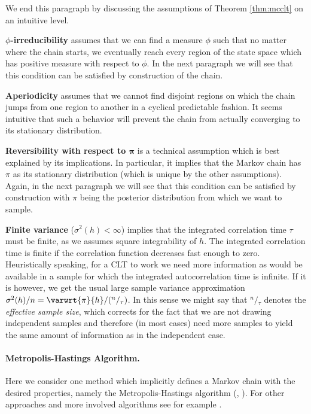 \noindent
We end this paragraph by discussing the assumptions of Theorem \ref{thm:mcclt} on an intuitive level.

\textbf{$\phi$-irreducibility} assumes that we can find a measure $\phi$ such that no matter where the chain starts, we eventually reach every region of the state space which has positive measure with respect to $\phi$.
In the next paragraph we will see that this condition can be satisfied by construction of the chain.

\textbf{Aperiodicity} assumes that we cannot find disjoint regions on which the chain jumps from one region to another in a cyclical predictable fashion.
It seems intuitive that such a behavior will prevent the chain from actually converging to its stationary distribution.

\textbf{Reversibility with respect to $\bm{\pi}$} is a technical assumption which is best explained by its implications.
In particular, it implies that the Markov chain has $\pi$ as its stationary distribution (which is unique by the other assumptions).
Again, in the next paragraph we will see that this condition can be satisfied by construction with $\pi$ being the posterior distribution from which we want to sample.

\textbf{Finite variance} ($\sigma^2(h) < \infty$) implies that the integrated correlation time $\tau$ must be finite, as we assumes square integrability of $h$.
The integrated correlation time is finite if the correlation function decreases fast enough to zero.
Heuristically speaking, for a CLT to work we need more information as would be available in a sample for which the integrated autocorrelation time is infinite.
If it is however, we get the usual large sample variance approximation $\sigma^2(h) / n = \varwrt{\pi}{h} / ({}^n/{}_\tau)$.
In this sense we might say that ${}^n/{}_\tau$ denotes the \emph{effective sample size}, which corrects for the fact that we are not drawing independent samples and therefore (in most cases) need more samples to yield the same amount of information as in the independent case.

\paragraph{Metropolis-Hastings Algorithm.}
Here we consider one method which implicitly defines a Markov chain with the desired properties, namely the Metropolis-Hastings algorithm (\citet{Metropolis1953}, \citet{hastings70}).
For other approaches and more involved algorithms see for example \citet{liang10}.

